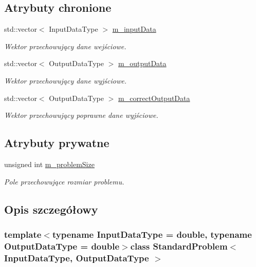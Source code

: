 \subsection*{Atrybuty chronione}
\begin{DoxyCompactItemize}
\item 
std\-::vector$<$ Input\-Data\-Type $>$ \hyperlink{class_standard_problem_ad1d5f039cd59372664a18ee57485252a}{m\-\_\-input\-Data}
\begin{DoxyCompactList}\small\item\em Wektor przechowujący dane wejściowe. \end{DoxyCompactList}\item 
std\-::vector$<$ Output\-Data\-Type $>$ \hyperlink{class_standard_problem_a2ca81280f88e1d8091cacceae8f2e073}{m\-\_\-output\-Data}
\begin{DoxyCompactList}\small\item\em Wektor przechowujący dane wyjściowe. \end{DoxyCompactList}\item 
std\-::vector$<$ Output\-Data\-Type $>$ \hyperlink{class_standard_problem_a7b736a0a91726c54363cedc43c80fbd2}{m\-\_\-correct\-Output\-Data}
\begin{DoxyCompactList}\small\item\em Wektor przechowujący poprawne dane wyjściowe. \end{DoxyCompactList}\end{DoxyCompactItemize}
\subsection*{Atrybuty prywatne}
\begin{DoxyCompactItemize}
\item 
unsigned int \hyperlink{class_standard_problem_ae8fc195a5e90d5cf0dd6c0417654741a}{m\-\_\-problem\-Size}
\begin{DoxyCompactList}\small\item\em Pole przechowujące rozmiar problemu. \end{DoxyCompactList}\end{DoxyCompactItemize}


\subsection{Opis szczegółowy}
\subsubsection*{template$<$typename Input\-Data\-Type = double, typename Output\-Data\-Type = double$>$class Standard\-Problem$<$ Input\-Data\-Type, Output\-Data\-Type $>$}

